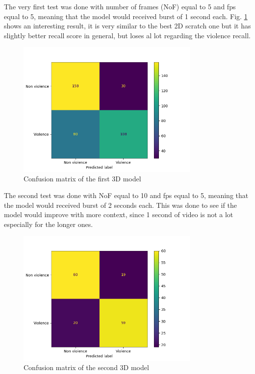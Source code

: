 The very first test was done with number of frames (NoF) equal to 5 and fps equal to 5, meaning that the model would received burst of 1 second each. Fig. \ref{fig:First3DCNNconfusionMatrix} shows an interesting result, it is very similar to the best 2D scratch one but it has slightly better recall score in general, but loses al lot regarding the violence recall.

\begin{figure}[]
    \centering
    \includegraphics[width=0.8\textwidth]{images/7f2d-testGiacomo3D9-9fcf-conf_matrix.png}
    \caption{Confusion matrix of the first 3D model}
    \label{fig:First3DCNNconfusionMatrix}
\end{figure}

The second test was done with NoF equal to 10 and fps equal to 5, meaning that the model would received burst of 2 seconds each. This was done to see if the model would improve with more context, since 1 second of video is not a lot especially for the longer ones. 

\begin{figure}[]
    \centering
    \includegraphics[width=0.8\textwidth]{images/ce07-testGiacomo3D3-9fcf-conf_matrix.png}
    \caption{Confusion matrix of the second 3D model}
    \label{fig:Second3DCNNconfusionMatrix}
\end{figure}

